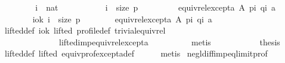 \begin{isabellebody}
\ \ \isamarkupfalse%
\isanewline
\ \ \ \ \isamarkupfalse%
\ i\ {\isacharcolon}{\kern0pt}{\isacharcolon}{\kern0pt}\ nat\isanewline
\ \ \ \ \isamarkupfalse%
\isanewline
\ \ \ \ \ \ {\isachardoublequoteopen}i\ {\isacharless}{\kern0pt}\ size\ p\ {\isasymlongrightarrow}\isanewline
\ \ \ \ \ \ \ \ equiv{\isacharunderscore}{\kern0pt}rel{\isacharunderscore}{\kern0pt}except{\isacharunderscore}{\kern0pt}a\ A\ {\isacharparenleft}{\kern0pt}p{\isacharbang}{\kern0pt}i{\isacharparenright}{\kern0pt}\ {\isacharparenleft}{\kern0pt}q{\isacharbang}{\kern0pt}i{\isacharparenright}{\kern0pt}\ a{\isachardoublequoteclose}\isanewline
\ \ \ \ \isamarkupfalse%
\isanewline
\ \ \ \ \ \ \isamarkupfalse%
\ i{\isacharunderscore}{\kern0pt}ok{\isacharcolon}{\kern0pt}\ {\isachardoublequoteopen}i\ {\isacharless}{\kern0pt}\ size\ p{\isachardoublequoteclose}\isanewline
\ \ \ \ \ \ \isamarkupfalse%
\ {\isachardoublequoteopen}equiv{\isacharunderscore}{\kern0pt}rel{\isacharunderscore}{\kern0pt}except{\isacharunderscore}{\kern0pt}a\ A\ {\isacharparenleft}{\kern0pt}p{\isacharbang}{\kern0pt}i{\isacharparenright}{\kern0pt}\ {\isacharparenleft}{\kern0pt}q{\isacharbang}{\kern0pt}i{\isacharparenright}{\kern0pt}\ a{\isachardoublequoteclose}\isanewline
\ \ \ \ \ \ \ \ \isamarkupfalse%
\ lifted{\isacharunderscore}{\kern0pt}def\ i{\isacharunderscore}{\kern0pt}ok\ lifted\ profile{\isacharunderscore}{\kern0pt}def\ trivial{\isacharunderscore}{\kern0pt}equiv{\isacharunderscore}{\kern0pt}rel\isanewline
\ \ \ \ \ \ \ \ \ \ \ \ \ \ lifted{\isacharunderscore}{\kern0pt}imp{\isacharunderscore}{\kern0pt}equiv{\isacharunderscore}{\kern0pt}rel{\isacharunderscore}{\kern0pt}except{\isacharunderscore}{\kern0pt}a\isanewline
\ \ \ \ \ \ \ \ \isamarkupfalse%
\ metis\isanewline
\ \ \ \ \isamarkupfalse%
\isanewline
\ \ \isamarkupfalse%
\isanewline
\ \ \isamarkupfalse%
\ {\isacharquery}{\kern0pt}thesis\isanewline
\ \ \ \ \isamarkupfalse%
\ lifted{\isacharunderscore}{\kern0pt}def\ lifted\ equiv{\isacharunderscore}{\kern0pt}prof{\isacharunderscore}{\kern0pt}except{\isacharunderscore}{\kern0pt}a{\isacharunderscore}{\kern0pt}def\isanewline
\ \ \ \ \isamarkupfalse%
\ metis\isanewline
{}\isamarkupfalse%
%
\endisatagproof
{\isafoldproof}%
%
\isadelimproof
\isanewline
%
\endisadelimproof
\isanewline
{}\isamarkupfalse%
\ negl{\isacharunderscore}{\kern0pt}diff{\isacharunderscore}{\kern0pt}imp{\isacharunderscore}{\kern0pt}eq{\isacharunderscore}{\kern0pt}limit{\isacharunderscore}{\kern0pt}prof{\isacharcolon}{\kern0pt}\isanewline

\end{isabellebody}
